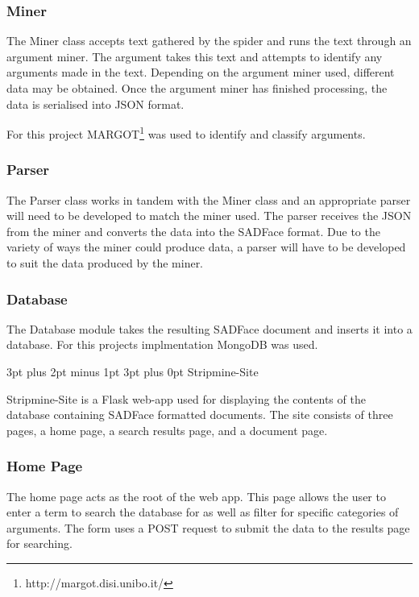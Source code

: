 \documentclass[12pt,a4paper]{article}
\makeatletter
\renewcommand\subsection{\@startsection {subsection}{1}{2mm} %
                               {3pt plus 2pt minus 1pt} %
                               {3pt plus 0pt} %
                               {\normalfont\bfseries}}
\makeatother
\begin{document}
\subsubsection{Miner}

The Miner class accepts text gathered by the spider and runs the text through an argument miner. The argument takes this text and attempts to identify any arguments made in the text. Depending on the argument miner used, different data may be obtained. Once the argument miner has finished processing, the data is serialised into JSON format.

For this project MARGOT\footnote{http://margot.disi.unibo.it/} was used to identify and classify arguments.

\subsubsection{Parser}

The Parser class works in tandem with the Miner class and an appropriate parser will need to be developed to match the miner used. The parser receives the JSON from the miner and converts the data into the SADFace format. Due to the variety of ways the miner could produce data, a parser will have to be developed to suit the data produced by the miner.

\subsubsection{Database}

The Database module takes the resulting SADFace document and inserts it into a database. For this projects implmentation MongoDB was used.

\subsection{Stripmine-Site}

Stripmine-Site is a Flask web-app used for displaying the contents of the database containing SADFace formatted documents. The site consists of three pages, a home page, a search results page, and a document page.

\subsubsection{Home Page}

The home page acts as the root of the web app. This page allows the user to enter a term to search the database for as well as filter for specific categories of arguments. The form uses a POST request to submit the data to the results page for searching.
\end{document}
